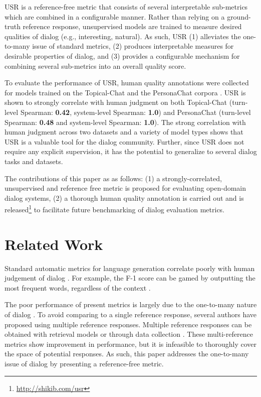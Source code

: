 \documentclass[11pt,a4paper]{article}
\begin{document}
USR is a reference-free metric that consists of several interpretable sub-metrics which are combined in a configurable manner. Rather than relying on a ground-truth reference response, unsupervised models are trained to measure desired qualities of dialog (e.g., interesting, natural). As such, USR (1) alleviates the one-to-many issue of standard metrics, (2) produces interpretable measures for desirable properties of dialog, and (3) provides a configurable mechanism for combining several sub-metrics into an overall quality score.

To evaluate the performance of USR, human quality annotations were collected for models trained on the Topical-Chat \citep{gopalakrishnan2019topical} and the PersonaChat corpora \citep{zhang2018personalizing}. USR is shown to strongly correlate with human judgment on both Topical-Chat (turn-level Spearman: \textbf{0.42}, system-level Spearman: \textbf{1.0}) and PersonaChat (turn-level Spearman: \textbf{0.48} and system-level Spearman: \textbf{1.0}). The strong correlation with human judgment across two datasets and a variety of model types shows that USR is a valuable tool for the dialog community. Further, since USR does not require any explicit supervision, it has the potential to generalize to several dialog tasks and datasets. 


The contributions of this paper as as follows: (1) a strongly-correlated, unsupervised and reference free metric is proposed for evaluating open-domain dialog systems, (2) a thorough human quality annotation is carried out and is released\footnote{\url{http://shikib.com/usr}} to facilitate future benchmarking of dialog evaluation metrics. 

\section{Related Work}

Standard automatic metrics for language generation correlate poorly with human judgement of dialog \citep{liu2016not,lowe-etal-2017-towards,gupta2019investigating}. For example, the F-1 score can be gamed by outputting the most frequent words, regardless of the context \citep{dinan2019second}. 

The poor performance of present metrics is largely due to the one-to-many nature of dialog \citep{zhao2017learning}. To avoid comparing to a single reference response, several authors have proposed using multiple reference responses. Multiple reference responses can be obtained with retrieval models \citep{galley-etal-2015-deltableu,Sordoni2015ANN} or through data collection \citep{gupta2019investigating}. These multi-reference metrics show improvement in performance, but it is infeasible to thoroughly cover the space of potential responses. As such, this paper addresses the one-to-many issue of dialog by presenting a reference-free metric.
\end{document}
